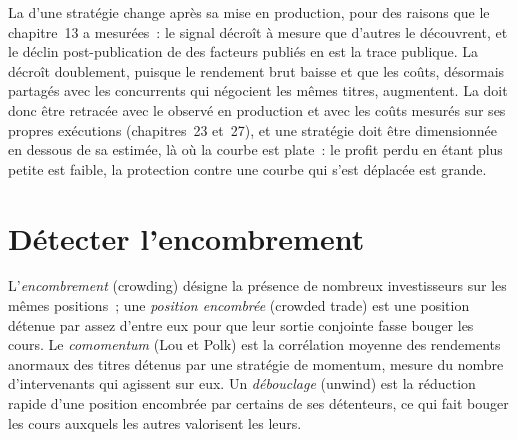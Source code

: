 La  d'une stratégie change après sa mise en production, pour des raisons que le chapitre~13 a mesurées~: le signal décroît à mesure que d'autres le découvrent, et le déclin post-publication de
des facteurs publiés en est la trace publique. La  décroît doublement, puisque le rendement brut baisse et que les coûts, désormais partagés avec les concurrents qui négocient
les mêmes titres, augmentent. La  doit donc être retracée avec le  observé en production et avec les coûts mesurés sur ses propres exécutions
(chapitres~23 et~27), et une stratégie doit être dimensionnée en dessous de sa  estimée, là où la courbe est plate~: le profit perdu en étant plus petite est
faible, la protection contre une courbe qui s'est déplacée est grande.

\section{Détecter l'encombrement}

\begin{definition}\label{def:rs:capacity-decay-and-crowding:crowding}
L'\emph{encombrement} (crowding) désigne la présence de nombreux investisseurs sur les mêmes positions~; une \emph{position encombrée} (crowded trade) est une position détenue par assez
d'entre eux pour que leur sortie conjointe fasse bouger les cours. Le \emph{comomentum} (Lou et Polk) est la corrélation moyenne des rendements anormaux des
titres détenus par une stratégie de momentum, mesure du nombre d'intervenants qui agissent sur eux. Un \emph{débouclage} (unwind) est la réduction rapide d'une position encombrée par certains
de ses détenteurs, ce qui fait bouger les cours auxquels les autres valorisent les leurs.
\end{definition}

